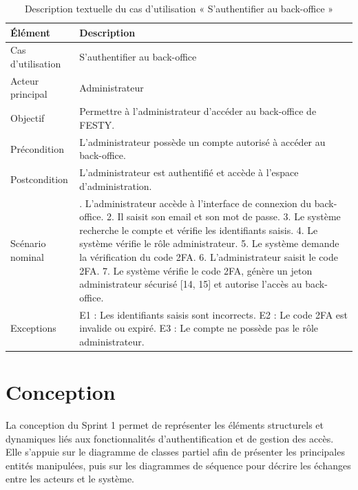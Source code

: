 \begin{table}[H]
\centering
\caption{Description textuelle du cas d’utilisation « S’authentifier au back-office »}
\label{tableau:3-5}
\renewcommand{\arraystretch}{1.2}
\begin{tabularx}{\textwidth}{|>{\raggedright\arraybackslash}X|>{\raggedright\arraybackslash}X|}
\hline
\rowcolor[HTML]{ECF4FF}
\textbf{Élément} & \textbf{Description} \\
\hline
Cas d’utilisation & S’authentifier au back-office \\
\hline
Acteur principal & Administrateur \\
\hline
Objectif & Permettre à l’administrateur d’accéder au back-office de FESTY. \\
\hline
Précondition & L’administrateur possède un compte autorisé à accéder au back-office. \\
\hline
Postcondition & L’administrateur est authentifié et accède à l’espace d’administration. \\
\hline
Scénario nominal & 1. L’administrateur accède à l’interface de connexion du back-office.\newline{} 2. Il saisit son email et son mot de passe.\newline{} 3. Le système recherche le compte et vérifie les identifiants saisis.\newline{} 4. Le système vérifie le rôle administrateur.\newline{} 5. Le système demande la vérification du code 2FA.\newline{} 6. L’administrateur saisit le code 2FA.\newline{} 7. Le système vérifie le code 2FA, génère un jeton administrateur sécurisé [14, 15] et autorise l’accès au back-office. \\
\hline
Exceptions & E1 : Les identifiants saisis sont incorrects.\newline{} E2 : Le code 2FA est invalide ou expiré.\newline{} E3 : Le compte ne possède pas le rôle administrateur. \\
\hline
\end{tabularx}
\end{table}


\section{Conception}


La conception du Sprint 1 permet de représenter les éléments structurels et dynamiques liés aux fonctionnalités d’authentification et de gestion des accès. Elle s’appuie sur le diagramme de classes partiel afin de présenter les principales entités manipulées, puis sur les diagrammes de séquence pour décrire les échanges entre les acteurs et le système.


